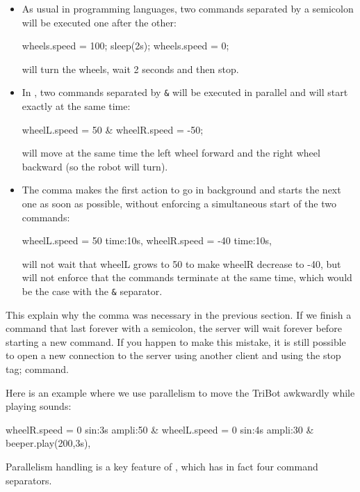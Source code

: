 \begin{itemize}
\item As usual in programming languages, two commands separated by a
  semicolon will be executed one after the other:
\begin{urbiunchecked}
wheels.speed = 100;
sleep(2s);
wheels.speed = 0;
\end{urbiunchecked}

\noindent
will turn the wheels, wait 2 seconds and then stop.

\item In \urbi, two commands separated by \lstinline|&| will be executed in
  parallel and will start exactly at the same time:
\begin{urbiunchecked}
wheelL.speed = 50 & wheelR.speed = -50;
\end{urbiunchecked}

\noindent
will move at the same time the left wheel forward and the right wheel
backward (so the robot will turn).

\item The comma makes the first action to go in background and starts the
  next one as soon as possible, without enforcing a simultaneous start of
  the two commands:
\begin{urbiunchecked}
wheelL.speed = 50 time:10s,
wheelR.speed = -40 time:10s,
\end{urbiunchecked}

\noindent
will not wait that wheelL grows to 50 to make wheelR decrease to -40, but
will not enforce that the commands terminate at the same time, which would
be the case with the \lstinline|&| separator.
\end{itemize}

This explain why the comma was necessary in the previous section. If we
finish a command that last forever with a semicolon, the server will wait
forever before starting a new command. If you happen to make this mistake,
it is still possible to open a new connection to the \urbi server using
another client and using the stop tag; command.

Here is an example where we use parallelism to move the TriBot awkwardly
while playing sounds:
\begin{urbiunchecked}
wheelR.speed = 0 sin:3s ampli:50 &
wheelL.speed = 0 sin:4s ampli:30 &
beeper.play(200,3s),
\end{urbiunchecked}

Parallelism handling is a key feature of \urbi, which has in fact four
command separators.

